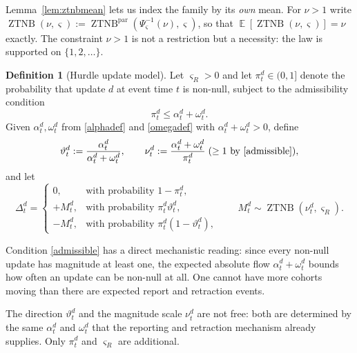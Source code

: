 \documentclass{article}
\theoremstyle{definition}
\newtheorem{definition}{Definition}
\theoremstyle{remark}
\newcommand{\E}{\operatorname{\mathbb{E}}}
\begin{document}
Lemma~\ref{lem:ztnbmean} lets us index the family by its \emph{own} mean. For
$\nu>1$ write $\operatorname{ZTNB}(\nu,\varsigma)
:=\operatorname{ZTNB}^{\mathrm{par}}(\Psi_\varsigma^{-1}(\nu),\varsigma)$, so that
$\E[\operatorname{ZTNB}(\nu,\varsigma)]=\nu$ exactly. The constraint $\nu>1$ is
not a restriction but a necessity: the law is supported on $\{1,2,\dots\}$.

\begin{definition}[Hurdle update model]\label{def:hurdle}
Let $\varsigma_R>0$ and let $\pi_t^d\in(0,1]$ denote the probability that update
$d$ at event time $t$ is non-null, subject to the admissibility condition
\begin{equation}\label{admissible}
    \pi_t^d\leq\alpha_t^d+\omega_t^d .
\end{equation}
Given $\alpha_t^d,\omega_t^d$ from \eqref{alphadef} and \eqref{omegadef} with
$\alpha_t^d+\omega_t^d>0$, define
\begin{equation}\label{hurdletheta}
    \vartheta_t^d
    :=
    \frac{\alpha_t^d}{\alpha_t^d+\omega_t^d},
    \qquad
    \nu_t^d
    :=
    \frac{\alpha_t^d+\omega_t^d}{\pi_t^d}\;(\geq1\text{ by }\eqref{admissible}),
\end{equation}
and let
\begin{equation}\label{hurdlelaw}
    \Delta_t^d
    =
    \begin{cases}
        0, & \text{with probability } 1-\pi_t^d,\\
        +M_t^d, & \text{with probability } \pi_t^d\vartheta_t^d,\\
        -M_t^d, & \text{with probability } \pi_t^d(1-\vartheta_t^d),
    \end{cases}
    \qquad
    M_t^d\sim\operatorname{ZTNB}(\nu_t^d,\varsigma_R).
\end{equation}
\end{definition}

Condition \eqref{admissible} has a direct mechanistic reading: since every
non-null update has magnitude at least one, the expected absolute flow
$\alpha_t^d+\omega_t^d$ bounds how often an update can be non-null at all. One
cannot have more cohorts moving than there are expected report and retraction
events.

The direction $\vartheta_t^d$ and the magnitude scale $\nu_t^d$ are not free:
both are determined by the same $\alpha_t^d$ and $\omega_t^d$ that the reporting
and retraction mechanism already supplies. Only $\pi_t^d$ and $\varsigma_R$ are
additional.
\end{document}
